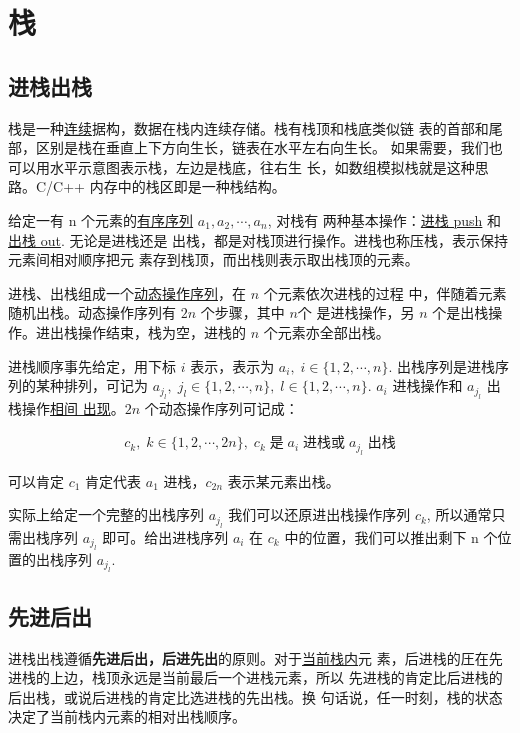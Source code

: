 \chapter{栈}
\label{cha:algo-stack}

\section{进栈出栈}

栈是一种\uline{连续}据构，数据在栈内连续存储。栈有栈顶和栈底类似链
表的首部和尾部，区别是栈在垂直上下方向生长，链表在水平左右向生长。
如果需要，我们也可以用水平示意图表示栈，左边是栈底，往右生
长，如数组模拟栈就是这种思路。C/C++ 内存中的栈区即是一种栈结构。

给定一有 n 个元素的\uline{有序序列} $a_1, a_2, \cdots, a_n$, 对栈有
两种基本操作：\uline{进栈 push} 和\uline{出栈 out}. 无论是进栈还是
出栈，都是对栈顶进行操作。进栈也称压栈，表示保持元素间相对顺序把元
素存到栈顶，而出栈则表示取出栈顶的元素。

进栈、出栈组成一个\uline{动态操作序列}，在 $n$ 个元素依次进栈的过程
中，伴随着元素随机出栈。动态操作序列有 $2n$ 个步骤，其中 $n$个
是进栈操作，另 $n$ 个是出栈操作。进出栈操作结束，栈为空，进栈的
$n$ 个元素亦全部出栈。

进栈顺序事先给定，用下标 $i$ 表示，表示为 $a_i,\; i \in
\{1,2,\cdots,n\}$. 出栈序列是进栈序列的某种排列，可记为
$a_{j_l},\; j_l \in \{1,2,\cdots,n\},\; l \in
\{1,2,\cdots,n\}$. $a_i$ 进栈操作和 $a_{j_l}$ 出栈操作\uline{相间
  出现}。$2n$ 个动态操作序列可记成：

\begin{align*}
  c_k,\; k \in \{1,2,\cdots,2n\},\; c_k\; \text{是}\; a_i\;
  \text{进栈或}\; a_{j_l}\; \text{出栈}
\end{align*}

可以肯定 $c_1$ 肯定代表 $a_1$ 进栈，$c_{2n}$ 表示某元素出栈。

实际上给定一个完整的出栈序列 $a_{j_l}$ 我们可以还原进出栈操作序列
$c_k$, 所以通常只需出栈序列 $a_{j_l}$ 即可。给出进栈序列 $a_i$ 在
$c_k$ 中的位置，我们可以推出剩下 n 个位置的出栈序列 $a_{j_l}$.

\section{先进后出}

进栈出栈遵循\textbf{先进后出，后进先出}的原则。对于\uline{当前栈内}元
素，后进栈的圧在先进栈的上边，栈顶永远是当前最后一个进栈元素，所以
先进栈的肯定比后进栈的后出栈，或说后进栈的肯定比选进栈的先出栈。换
句话说，任一时刻，栈的状态决定了当前栈内元素的相对出栈顺序。

